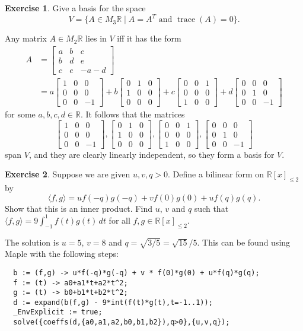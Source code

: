 \documentclass{amsart}
\newcommand{\R}         {{\mathbb{R}}}
\newcommand{\bsm}       {\left[\begin{smallmatrix}}
\newcommand{\esm}       {\end{smallmatrix}\right]}
\newcommand{\ip}[1]     {\langle #1\rangle}
\newcommand{\st}        {\;|\;}
\newcommand{\trace}     {\operatorname{trace}}
\renewcommand{\:}{\colon}
\theoremstyle{definition}
\newtheorem{exercise}{Exercise}
\newenvironment{solution}{{\noindent \bf Solution:}}{}
\begin{document}
\begin{exercise}
 Give a basis for the space 
 \[ V = \{A\in M_3\R\st A = A^T \text{ and } \trace(A)=0\}.
 \]
\end{exercise}
\begin{solution}
 Any matrix $A\in M_2\R$ lies in $V$ iff it has the form 
 \begin{align*}
  A &= \bsm a & b & c \\ b & d & e \\ c & e & -a-d \esm \\
    &= a \bsm 1&0&0 \\ 0&0&0 \\ 0&0&-1 \esm + 
       b \bsm 0&1&0 \\ 1&0&0 \\ 0&0&0 \esm +
       c \bsm 0&0&1 \\ 0&0&0 \\ 1&0&0 \esm + 
       d \bsm 0&0&0 \\ 0&1&0 \\ 0&0&-1 \esm
 \end{align*}
 for some $a,b,c,d\in\R$.  It follows that the matrices
 \[    \bsm 1&0&0 \\ 0&0&0 \\ 0&0&-1 \esm,
       \bsm 0&1&0 \\ 1&0&0 \\ 0&0&0 \esm,
       \bsm 0&0&1 \\ 0&0&0 \\ 1&0&0 \esm, 
       \bsm 0&0&0 \\ 0&1&0 \\ 0&0&-1 \esm
 \]
 span $V$, and they are clearly linearly independent, so
 they form a basis for $V$.
\end{solution}


\begin{exercise}
 Suppose we are given $u,v,q>0$.  Define a bilinear form on
 $\R[x]_{\leq 2}$ by
 \[ \ip{f,g} = u f(-q)g(-q) + v f(0)g(0) + u f(q)g(q). \]
 Show that this is an inner product.  Find $u$, $v$ and $q$
 such that $\ip{f,g}=9\int_{-1}^1 f(t)g(t)\,dt$ for all
 $f,g\in\R[x]_{\leq 2}$.
\end{exercise}
\begin{solution}
 The solution is $u=5$, $v=8$ and
 $q=\sqrt{3/5}=\sqrt{15}/5$.  This can be found using Maple
 with the following steps:
 \begin{verbatim}
  b := (f,g) -> u*f(-q)*g(-q) + v * f(0)*g(0) + u*f(q)*g(q);
  f := (t) -> a0+a1*t+a2*t^2;
  g := (t) -> b0+b1*t+b2*t^2;
  d := expand(b(f,g) - 9*int(f(t)*g(t),t=-1..1));
  _EnvExplicit := true;
  solve({coeffs(d,{a0,a1,a2,b0,b1,b2}),q>0},{u,v,q});
 \end{verbatim}
\end{solution}
\end{document}

